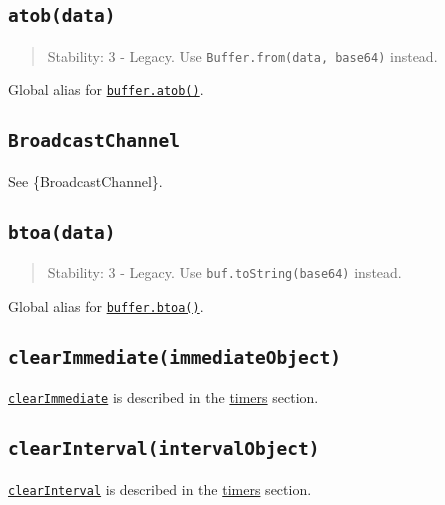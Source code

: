 \subsection{\texorpdfstring{\texttt{atob(data)}}{atob(data)}}\label{atobdata}

\begin{quote}
Stability: 3 - Legacy. Use
\texttt{Buffer.from(data,\ \textquotesingle{}base64\textquotesingle{})}
instead.
\end{quote}

Global alias for
\href{buffer.md\#bufferatobdata}{\texttt{buffer.atob()}}.

\subsection{\texorpdfstring{\texttt{BroadcastChannel}}{BroadcastChannel}}\label{broadcastchannel}

See \{BroadcastChannel\}.

\subsection{\texorpdfstring{\texttt{btoa(data)}}{btoa(data)}}\label{btoadata}

\begin{quote}
Stability: 3 - Legacy. Use
\texttt{buf.toString(\textquotesingle{}base64\textquotesingle{})}
instead.
\end{quote}

Global alias for
\href{buffer.md\#bufferbtoadata}{\texttt{buffer.btoa()}}.

\subsection{\texorpdfstring{\texttt{clearImmediate(immediateObject)}}{clearImmediate(immediateObject)}}\label{clearimmediateimmediateobject}

\href{timers.md\#clearimmediateimmediate}{\texttt{clearImmediate}} is
described in the \href{timers.md}{timers} section.

\subsection{\texorpdfstring{\texttt{clearInterval(intervalObject)}}{clearInterval(intervalObject)}}\label{clearintervalintervalobject}

\href{timers.md\#clearintervaltimeout}{\texttt{clearInterval}} is
described in the \href{timers.md}{timers} section.

